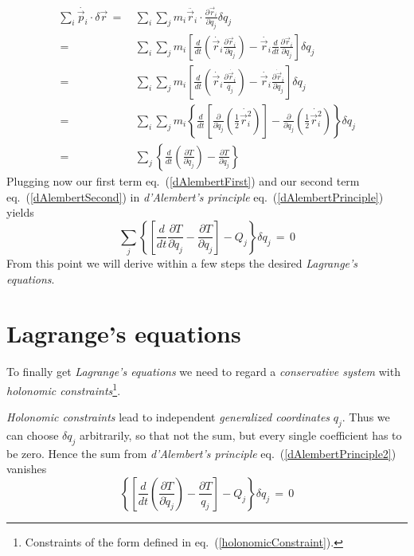 \begin{equation}
  \label{dAlembertSecond}
  \begin{aligned}
    \sum_i \dot{\vec p_i} \cdot \delta \vec r \,=\,& \sum_i \sum_j m_i \ddot{\vec
r_i} \cdot \frac{\partial \vec r_i}{\partial q_j} \delta q_j \\
    \,=\,& \sum_i \sum_j m_i \left[\frac{d}{dt}\left(\dot{\vec r_i}  \frac{\partial \vec r_i}{\partial
q_j}\right) - \dot{\vec r_i} \frac{d}{dt} \frac{\partial \vec r_i}{\partial q_j} \right] \delta q_j
\\
    \,=\,& \sum_i \sum_j m_i \left[\frac{d}{dt} \left(\dot{\vec r_i} \frac{\partial
\dot{\vec r_i}}{\dot{q_j}}\right) - \dot{\vec r_i} \frac{\dot{\partial \vec
r_i}}{\partial q_j}\right] \delta q_j \\
    \,=\,& \sum_i \sum_j m_i \left\{\frac{d}{dt} \left[ \frac{\partial}{\partial
\dot q_j}\left(\frac{1}{2} \dot{\vec r_i^2}\right)\right] - \frac{\partial}{\partial
q_j} \left(\frac{1}{2} \dot{\vec r_i^2} \right)\right\} \delta q_j \\
    \,=\,& \sum_j \left\{ \frac{d}{dt} \left(\frac{\partial T}{\partial \dot
q_j}\right) - \frac{\partial T}{\partial q_j} \right\} 
  \end{aligned}
\end{equation}
Plugging now our first term eq.~(\ref{dAlembertFirst}) and our second term
eq.~(\ref{dAlembertSecond}) in \textit{d'Alembert's principle}
eq.~(\ref{dAlembertPrinciple}) yields 
\begin{equation}
  \label{dAlembertPrinciple2}
  \sum_j \left\{ \left[\frac{d}{dt} \frac{\partial T}{\partial \dot q_j} -
\frac{\partial T}{\partial q_j}\right] - Q_j \right\} \delta q_j \,=\, 0
\end{equation}
From this point we will derive within a few steps the desired
\textit{Lagrange's equations}.

\section{Lagrange's equations}
To finally get \textit{Lagrange's equations} we need to regard a
\textit{conservative system} with \textit{holonomic
constraints}\footnote{Constraints of the form defined in
eq.~(\ref{holonomicConstraint}).}. 

\textit{Holonomic constraints} lead to independent \textit{generalized
coordinates} $q_j$. Thus we can choose $\delta q_j$ arbitrarily, so that not
the sum, but every single coefficient has to be zero. Hence the sum from
\textit{d'Alembert's principle} eq.~(\ref{dAlembertPrinciple2}) vanishes
\begin{equation}
  \left\{ \left[\frac{d}{dt} \left(\frac{\partial T}{\partial \dot q_j} \right) -
\frac{\partial T}{q_j} \right]- Q_j \right\} \delta q_j \,=\, 0
\end{equation}

